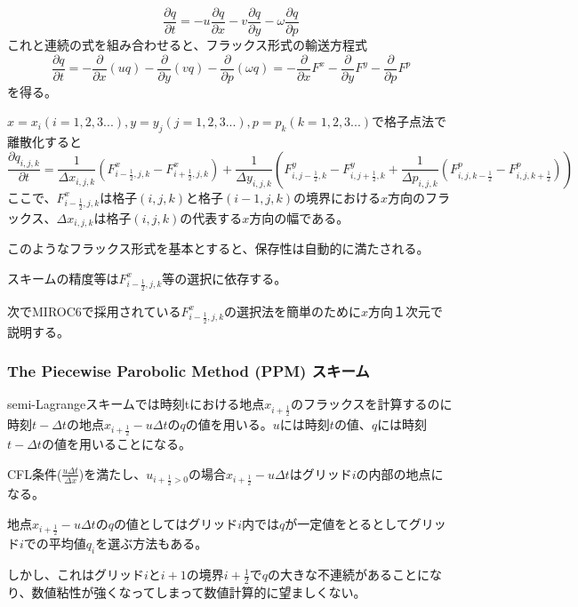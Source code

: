 \documentclass{jsbook}
\begin{document}
\begin{equation}
\frac{\partial q}{\partial t} = -u \frac{\partial q}{\partial x}-v \frac{\partial q}{\partial y}-\omega \frac{\partial q}{\partial p}
\end{equation}
これと連続の式を組み合わせると、フラックス形式の輸送方程式
\begin{equation}
  \frac{\partial q}{\partial t}=-\frac{\partial}{\partial x}(uq)-\frac{\partial}{\partial y}(vq)-\frac{\partial}{\partial p}(\omega q)
  =-\frac{\partial}{\partial x}F^{x}-\frac{\partial}{\partial y}F^{y}-\frac{\partial}{\partial p}F^{p}
\end{equation}
を得る。

$x=x_{i} (i=1,2,3...), y=y_{j} (j=1,2,3...), p=p_{k} (k=1,2,3...)$で格子点法で離散化すると
\begin{equation}
  \frac{\partial q_{i,j,k}}{\partial t}=\frac{1}{\Delta x_{i,j,k}}(F^{x}_{i-\frac{1}{2},j,k}-F^{x}_{i+\frac{1}{2},j,k})+\frac{1}{\Delta y_{i,j,k}}(F^{y}_{i,j-\frac{1}{2},k}-F^{y}_{i,j+\frac{1}{2},k}+\frac{1}{\Delta p_{i,j,k}}(F^{p}_{i,j,k-\frac{1}{2}}-F^{p}_{i,j,k+\frac{1}{2}}))
\end{equation}
ここで、$F^{x}_{i-\frac{1}{2},j,k}$は格子$(i,j,k)$と格子$(i-1,j,k)$の境界における$x$方向のフラックス、$\Delta x_{i,j,k}$は格子$(i,j,k)$の代表する$x$方向の幅である。

このようなフラックス形式を基本とすると、保存性は自動的に満たされる。

スキームの精度等は$F^{x}_{i-\frac{1}{2},j,k}$等の選択に依存する。

次でMIROC6で採用されている$F^{x}_{i-\frac{1}{2},j,k}$の選択法を簡単のために$x$方向１次元で説明する。
\subsubsection{The Piecewise Parobolic Method (PPM) スキーム}
semi-Lagrangeスキームでは時刻tにおける地点$x_{i+\frac{1}{2}}$のフラックスを計算するのに時刻$t-\Delta t$の地点$x_{i+\frac{1}{2}}-u\Delta t$の$q$の値を用いる。$u$には時刻$t$の値、$q$には時刻$t-\Delta t$の値を用いることになる。

CFL条件($\frac{u\Delta t}{\Delta x}$)を満たし、$u_{i+\frac{1}{2}>0}$の場合$x_{i+\frac{1}{2}}-u\Delta t$はグリッド$i$の内部の地点になる。

地点$x_{i+\frac{1}{2}}-u\Delta t$の$q$の値としてはグリッド$i$内では$q$が一定値をとるとしてグリッド$i$での平均値$q_{i}$を選ぶ方法もある。

しかし、これはグリッド$i$と$i+1$の境界$i+\frac{1}{2}$で$q$の大きな不連続があることになり、数値粘性が強くなってしまって数値計算的に望ましくない。
\end{document}

